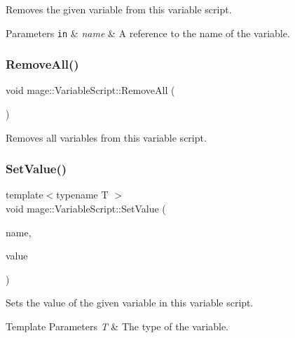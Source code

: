 Removes the given variable from this variable script.


\begin{DoxyParams}[1]{Parameters}
\mbox{\tt in}  & {\em name} & A reference to the name of the variable. \\
\hline
\end{DoxyParams}
\mbox{\label{classmage_1_1_variable_script_add51955d83e85e6d6acd82cfe40bed26}} 
\subsubsection{\texorpdfstring{Remove\+All()}{RemoveAll()}}
{\footnotesize\ttfamily void mage\+::\+Variable\+Script\+::\+Remove\+All (\begin{DoxyParamCaption}{ }\end{DoxyParamCaption})\hspace{0.3cm}{\ttfamily [noexcept]}}

Removes all variables from this variable script. \mbox{\label{classmage_1_1_variable_script_a87095ed6e4668629d3ffa7a390c6799b}} 
\subsubsection{\texorpdfstring{Set\+Value()}{SetValue()}}
{\footnotesize\ttfamily template$<$typename T $>$ \\
void mage\+::\+Variable\+Script\+::\+Set\+Value (\begin{DoxyParamCaption}\item[{const std\+::string \&}]{name,  }\item[{T}]{value }\end{DoxyParamCaption})}

Sets the value of the given variable in this variable script.


\begin{DoxyTemplParams}{Template Parameters}
{\em T} & The type of the variable. \\
\hline
\end{DoxyTemplParams}

